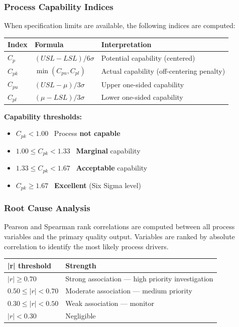 \documentclass[12pt,a4paper]{article}
\begin{document}
\subsubsection*{Process Capability Indices}

When specification limits are available, the following indices are computed:

\begin{center}
\begin{tabular}{lll}
\toprule
\textbf{Index} & \textbf{Formula} & \textbf{Interpretation} \\
\midrule
$C_p$  & $(USL - LSL) / 6\sigma$ & Potential capability (centered) \\
$C_{pk}$ & $\min(C_{pu}, C_{pl})$ & Actual capability (off-centering penalty) \\
$C_{pu}$ & $(USL - \mu) / 3\sigma$ & Upper one-sided capability \\
$C_{pl}$ & $(\mu - LSL) / 3\sigma$ & Lower one-sided capability \\
\bottomrule
\end{tabular}
\end{center}

\medskip

\textbf{Capability thresholds:}
\begin{itemize}[leftmargin=2em]
  \item $C_{pk} < 1.00$ \textrightarrow\ Process \textcolor{sigmaRed}{\textbf{not capable}}
  \item $1.00 \le C_{pk} < 1.33$ \textrightarrow\ \textcolor{sigmaOrange}{\textbf{Marginal}} capability
  \item $1.33 \le C_{pk} < 1.67$ \textrightarrow\ \textcolor{sigmaGreen}{\textbf{Acceptable}} capability
  \item $C_{pk} \ge 1.67$ \textrightarrow\ \textcolor{sigmaGreen}{\textbf{Excellent}} (Six Sigma level)
\end{itemize}

\subsubsection*{Root Cause Analysis}

Pearson and Spearman rank correlations are computed between all process
variables and the primary quality output. Variables are ranked by absolute
correlation to identify the most likely process drivers.

\begin{center}
\begin{tabular}{ll}
\toprule
\textbf{|r| threshold} & \textbf{Strength} \\
\midrule
$|r| \ge 0.70$ & Strong association — high priority investigation \\
$0.50 \le |r| < 0.70$ & Moderate association — medium priority \\
$0.30 \le |r| < 0.50$ & Weak association — monitor \\
$|r| < 0.30$ & Negligible \\
\bottomrule
\end{tabular}
\end{center}
\end{document}
